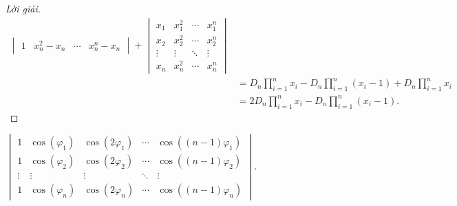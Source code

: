 \documentclass[class=nhvh-linear-algebra,crop=false]{standalone}
\begin{document}
\begin{proof}[Lời giải]
\begin{align*}
\begin{vmatrix}
			1      & x_{n}^{2} - x_{n} & \cdots & x_{n}^{n} - x_{n}
		\end{vmatrix}
		+
		\begin{vmatrix}
			x_{1}  & x_{1}^{2} & \cdots & x_{1}^{n} \\
			x_{2}  & x_{2}^{2} & \cdots & x_{2}^{n} \\
			\vdots & \vdots    & \ddots & \vdots    \\
			x_{n}  & x_{n}^{2} & \cdots & x_{n}^{n}
		\end{vmatrix}                                                      \\
		 & = D_{n}\prod^{n}_{i=1}x_{i} - D_{n}\prod^{n}_{i=1}(x_{i} - 1) + D_{n}\prod^{n}_{i=1}x_{i} \\
		 & = 2D_{n}\prod^{n}_{i=1}x_{i} - D_{n}\prod^{n}_{i=1}(x_{i} - 1).
	\end{align*}
	\endgroup{}
\end{proof}

\begin{exercise}
	$\begin{vmatrix}
			1      & \cos(\varphi_{1}) & \cos(2\varphi_{1}) & \cdots & \cos((n-1)\varphi_{1}) \\
			1      & \cos(\varphi_{2}) & \cos(2\varphi_{2}) & \cdots & \cos((n-1)\varphi_{2}) \\
			\vdots & \vdots            & \vdots             & \ddots & \vdots                 \\
			1      & \cos(\varphi_{n}) & \cos(2\varphi_{n}) & \cdots & \cos((n-1)\varphi_{n})
		\end{vmatrix}$.
\end{exercise}
\end{document}
